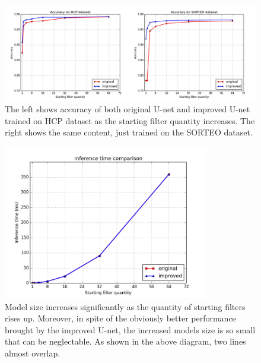 \documentclass[sigconf]{acmart}
\begin{document}
\begin{figure}
  \centering
  \includegraphics[width=15cm]{fig2.jpg}
    \caption{The left shows accuracy of both original U-net and improved U-net trained on HCP dataset as the starting filter quantity increases. The right shows the same content, just trained on the SORTEO dataset.}
  \label{fig:fig2}
\end{figure}

\begin{figure}
  \centering
  \includegraphics[width=9cm]{fig3.png}
    \caption{Model size increases significantly as the quantity of starting filters rises up. Moreover, in spite of the obviously better performance brought by the improved U-net, the increased models size is so small that can be neglectable. As shown in the above diagram, two lines almost overlap.}
  \label{fig:fig3}
\end{figure}
\end{document}

